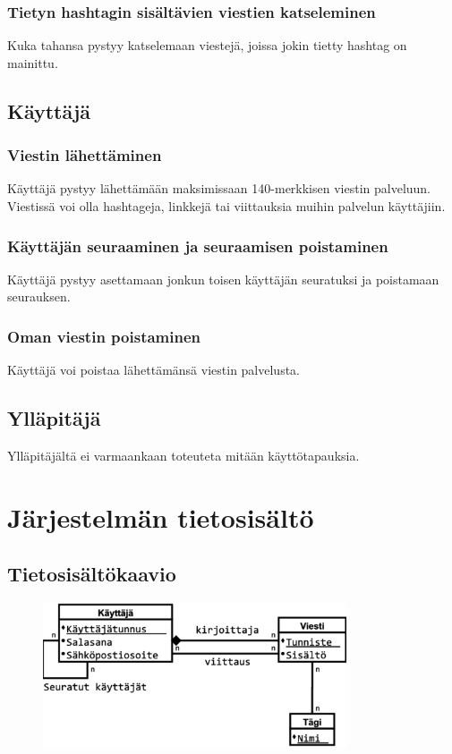 \documentclass{article}
\begin{document}
\subsubsection{Tietyn hashtagin sisältävien viestien katseleminen}
Kuka tahansa pystyy katselemaan viestejä, joissa jokin tietty hashtag on mainittu.

\subsection{Käyttäjä}

\subsubsection{Viestin lähettäminen}
Käyttäjä pystyy lähettämään maksimissaan 140-merkkisen viestin palveluun. Viestissä voi olla hashtageja, linkkejä tai viittauksia muihin palvelun käyttäjiin.

\subsubsection{Käyttäjän seuraaminen ja seuraamisen poistaminen}
Käyttäjä pystyy asettamaan jonkun toisen käyttäjän seuratuksi ja poistamaan seurauksen.

\subsubsection{Oman viestin poistaminen}
Käyttäjä voi poistaa lähettämänsä viestin palvelusta.

\subsection{Ylläpitäjä}
Ylläpitäjältä ei varmaankaan toteuteta mitään käyttötapauksia.

\section{Järjestelmän tietosisältö}

\subsection{Tietosisältökaavio}

\begin{figure}[H]
    \centering
    \includegraphics[width=0.8\textwidth]{tietosisalto.pdf}
\end{figure}
\end{document}
